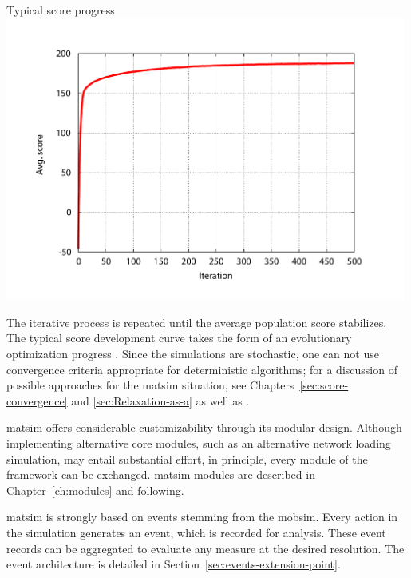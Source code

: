 %
{Typical score progress}%
{\label{fig:scoreprogress}}%
{\includegraphics[width=0.99\textwidth, angle=0]{using/figures/scores.pdf}}%
{}

The iterative process is repeated until the average population score stabilizes.
The typical score development curve \citep[Figure~\ref{fig:scoreprogress}, taken from][]{HorniEtAl_TRR_2009} takes the form of an evolutionary optimization progress \citep[][Figure~2.5]{EibenSmithJE_2003}.  Since the simulations are stochastic, one can not use convergence criteria appropriate for deterministic algorithms; for a discussion of possible approaches for the \gls{matsim} situation, see Chapters~\ref{sec:score-convergence} and \ref{sec:Relaxation-as-a} as well as \citet{Meister_PhDThesis_2011}.

\gls{matsim} offers considerable customizability through its modular design. Although %
implementing alternative core modules, such as an alternative network loading simulation, may entail substantial effort,
in principle, every module of the framework can be exchanged. \gls{matsim} modules are described in Chapter~\ref{ch:modules} and following.

\gls{matsim} is strongly based on events stemming from the \gls{mobsim}. Every action in the simulation generates an event, which is recorded for analysis. These event records can be aggregated to evaluate any measure at the desired resolution. The event architecture is detailed in Section~\ref{sec:events-extension-point}.

